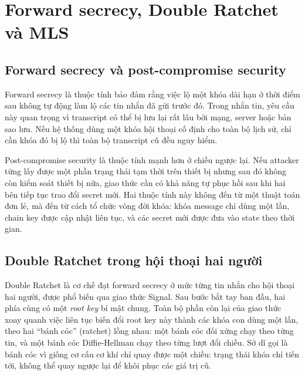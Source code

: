 \section{Forward secrecy, Double Ratchet và MLS}

\subsection{Forward secrecy và post-compromise security}

Forward secrecy là thuộc tính bảo đảm rằng việc lộ một khóa dài hạn ở thời điểm sau không tự động làm lộ các tin nhắn đã gửi trước đó. Trong nhắn tin, yêu cầu này quan trọng vì transcript có thể bị lưu lại rất lâu bởi mạng, server hoặc bản sao lưu. Nếu hệ thống dùng một khóa hội thoại cố định cho toàn bộ lịch sử, chỉ cần khóa đó bị lộ thì toàn bộ transcript cũ đều nguy hiểm.

Post-compromise security là thuộc tính mạnh hơn ở chiều ngược lại. Nếu attacker từng lấy được một phần trạng thái tạm thời trên thiết bị nhưng sau đó không còn kiểm soát thiết bị nữa, giao thức cần có khả năng tự phục hồi sau khi hai bên tiếp tục trao đổi secret mới. Hai thuộc tính này không đến từ một thuật toán đơn lẻ, mà đến từ cách tổ chức vòng đời khóa: khóa message chỉ dùng một lần, chain key được cập nhật liên tục, và các secret mới được đưa vào state theo thời gian.

\subsection{Double Ratchet trong hội thoại hai người}\label{subsec:theory-dr}

Double Ratchet là cơ chế đạt forward secrecy ở mức từng tin nhắn cho hội thoại hai người, được phổ biến qua giao thức Signal. Sau bước bắt tay ban đầu, hai phía cùng có một \emph{root key} bí mật chung. Toàn bộ phần còn lại của giao thức xoay quanh việc liên tục biến đổi root key này thành các khóa con dùng một lần, theo hai ``bánh cóc'' (ratchet) lồng nhau: một bánh cóc đối xứng chạy theo từng tin, và một bánh cóc Diffie-Hellman chạy theo từng lượt đổi chiều. Sở dĩ gọi là bánh cóc vì giống cơ cấu cơ khí chỉ quay được một chiều: trạng thái khóa chỉ tiến tới, không thể quay ngược lại để khôi phục các giá trị cũ.

